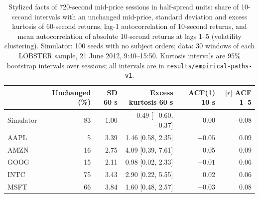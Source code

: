 \documentclass{article}
\begin{document}
\begin{table}[t]
\centering
\caption{Stylized facts of 720-second mid-price sessions in half-spread units: share of 10-second intervals with an unchanged mid-price, standard deviation and excess kurtosis of 60-second returns, lag-1 autocorrelation of 10-second returns, and mean autocorrelation of absolute 10-second returns at lags 1--5 (volatility clustering). Simulator: 100 seeds with no subject orders; data: 30 windows of each LOBSTER sample, 21 June 2012, 9:40--15:50. Kurtosis intervals are 95\% bootstrap intervals over sessions; all intervals are in \texttt{results/empirical-paths-v1}.}\label{tab:facts}
\begin{tabular}{lrrrrr}
\toprule
 & Unchanged (\%) & SD 60 s & Excess kurtosis 60 s & ACF(1) 10 s & $|r|$ ACF 1--5 \\
\midrule
Simulator & 83 & 1.00 & $-0.49$ [$-0.60$, $-0.37$] & 0.00 & $-0.08$ \\
AAPL & 5 & 3.39 & 1.46 [0.58, 2.35] & $-0.05$ & 0.09 \\
AMZN & 16 & 2.75 & 4.09 [0.39, 7.61] & 0.05 & 0.09 \\
GOOG & 15 & 2.11 & 0.98 [0.02, 2.33] & $-0.01$ & 0.06 \\
INTC & 75 & 3.43 & 2.90 [0.22, 5.55] & 0.02 & 0.06 \\
MSFT & 66 & 3.84 & 1.60 [0.48, 2.57] & $-0.03$ & 0.08 \\
\bottomrule
\end{tabular}
\end{table}
\end{document}
